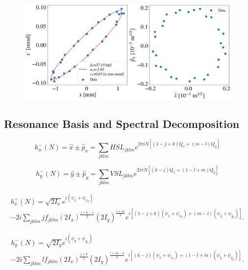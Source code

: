 \begin{figure}[H]
    \centering
    \includegraphics[width=\columnwidth]{chapter4/ellipse_data.png}
    \caption{}
    \label{fig:ellipse}
\end{figure}

\subsection{Resonance Basis and Spectral Decomposition}

\begin{equation}
    \label{eq:hxspect}
    h_x^{-}(N)= \hat{x} \pm \hat{p}_x = \sum_{jklm}HSL_{jklm}e^{2\pi i N \left[ \left( 1-j+k\right)Q_x+\left( m-l \right)Q_y\right]}
\end{equation}

\begin{equation}
    \label{eq:hyspect}
    h_y^{-}(N)= \hat{y} \pm \hat{p}_y = \sum_{jklm}VSL_{jklm}e^{2\pi i N \left[ \left( k-j\right)Q_x+\left(1-l+m \right)Q_y\right]}
\end{equation}

\begin{multline}
    \label{eq:hxpsi2}
    h_x^{-}(N)=\sqrt{2I_x}e^{i\left( \psi_x+\psi_{x_0}\right)} \\
    -2i \sum_{jklm} j f_{jklm} \left( 2I_x \right)^{\frac{j+k-1}{2}}\left( 2I_y \right)^{\frac{l+m}{2}}
    e^{i \left[ \left( 1-j+k\right)\left( \psi_x + \psi_{x_0} \right) +\left( m-l\right)\left( \psi_y + \psi_{y_0} \right)\right]}.
\end{multline}

\begin{multline}
    \label{eq:hypsi2}
    h_y^{-}(N)=\sqrt{2I_y}e^{i\left( \psi_y+\psi_{y_0}\right)} \\
    -2i \sum_{jklm} l f_{jklm} \left( 2I_x \right)^{\frac{j+k}{2}}\left( 2I_y \right)^{\frac{l+m-1}{2}}
    e^{i \left[ \left( k-j\right)\left( \psi_x + \psi_{x_0} \right) +\left( 1-l+m\right)\left( \psi_y + \psi_{y_0} \right)\right]}.
\end{multline}

